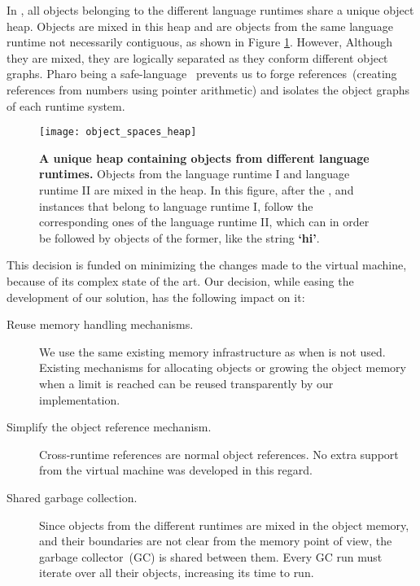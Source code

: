 In \Vtt, all objects belonging to the different language runtimes share a unique object heap. Objects are mixed in this heap and are objects from the same language runtime not necessarily contiguous, as shown in Figure \ref{fig:heap}. However, Although they are mixed, they are logically separated as they conform different object graphs. Pharo being a safe-language~\cite{Hawb98a,Hawb02a} prevents us to forge references~(\ie creating references from numbers using pointer arithmetic) and isolates the object graphs of each runtime system.

\begin{figure}[ht]
\begin{center}
\texttt{[image: object\_spaces\_heap]}
\caption{\textbf{A unique heap containing objects from different language runtimes.} Objects from the language runtime I and language runtime II are mixed in the heap. In this figure, after the ,  and  instances that belong to language runtime I, follow the corresponding ones of the language runtime II, which can in order be followed by objects of the former, like the string \textbf{`hi'}. \label{fig:heap}}
\end{center}
\end{figure}

This decision is funded on minimizing the changes made to the virtual machine, because of its complex state of the art. Our decision, while easing the development of our solution, has the following impact on it:

\begin{description}
	\item[Reuse memory handling mechanisms.] We use the same existing memory infrastructure as when \Vtt is not used. Existing mechanisms for allocating objects or growing the object memory when a limit is reached can be reused transparently by our implementation. 
	\item[Simplify the object reference mechanism.] Cross-runtime references are normal object references. No extra support from the virtual machine was developed in this regard.
	\item[Shared garbage collection.] Since objects from the different runtimes are mixed in the object memory, and their boundaries are not clear from the memory point of view, the garbage collector~(GC) is shared between them. Every GC run must iterate over all their objects, increasing its time to run.
\end{description}

